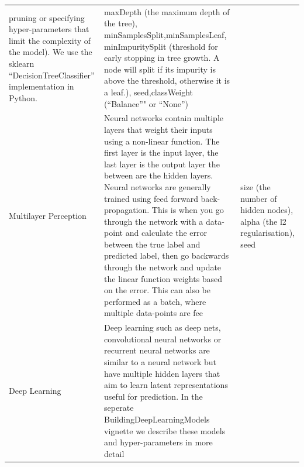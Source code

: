 \documentclass[]{book}
\begin{document}
\begin{longtable}[]{@{}lll@{}}
\begin{minipage}[t]{0.55\columnwidth}
pruning or specifying hyper-parameters that limit the complexity of the
model). We use the sklearn ``DecisionTreeClassifier'' implementation in
Python.\strut
\end{minipage} & \begin{minipage}[t]{0.25\columnwidth}\raggedright\strut
maxDepth (the maximum depth of the tree),
minSamplesSplit,minSamplesLeaf, minImpuritySplit (threshold for early
stopping in tree growth. A node will split if its impurity is above the
threshold, otherwise it is a leaf.), seed,classWeight (``Balance''" or
``None'')\strut
\end{minipage}\tabularnewline
\begin{minipage}[t]{0.12\columnwidth}\raggedright\strut
Multilayer Perception\strut
\end{minipage} & \begin{minipage}[t]{0.55\columnwidth}\raggedright\strut
Neural networks contain multiple layers that weight their inputs using a
non-linear function. The first layer is the input layer, the last layer
is the output layer the between are the hidden layers. Neural networks
are generally trained using feed forward back-propagation. This is when
you go through the network with a data-point and calculate the error
between the true label and predicted label, then go backwards through
the network and update the linear function weights based on the error.
This can also be performed as a batch, where multiple data-points are
fee\strut
\end{minipage} & \begin{minipage}[t]{0.25\columnwidth}\raggedright\strut
size (the number of hidden nodes), alpha (the l2 regularisation),
seed\strut
\end{minipage}\tabularnewline
\begin{minipage}[t]{0.12\columnwidth}\raggedright\strut
Deep Learning\strut
\end{minipage} & \begin{minipage}[t]{0.55\columnwidth}\raggedright\strut
Deep learning such as deep nets, convolutional neural networks or
recurrent neural networks are similar to a neural network but have
multiple hidden layers that aim to learn latent representations useful
for prediction. In the seperate BuildingDeepLearningModels vignette we
describe these models and hyper-parameters in more detail\strut
\end{minipage} & \begin{minipage}[t]{0.25\columnwidth}\raggedright\strut
\strut
\end{minipage}\tabularnewline
\bottomrule
\end{longtable}
\end{document}
